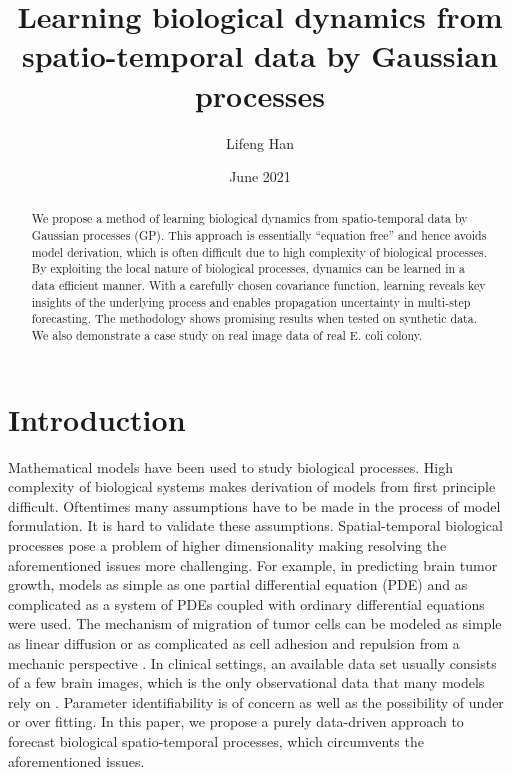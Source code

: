 \documentclass[11pt, reqno]{amsart}
\title[Learning biological dynamics]{Learning biological dynamics from spatio-temporal data by Gaussian processes}
\author{Lifeng Han}
\date{June 2021}
\begin{document}
\onehalfspacing

\begin{abstract}
We propose a method of learning biological dynamics from spatio-temporal data by Gaussian processes (GP). This approach is essentially ``equation free'' and hence avoids model derivation, which is often difficult due to high complexity of biological processes. By exploiting the local nature of biological processes, dynamics can be learned in a data efficient manner. With a carefully chosen covariance function, learning reveals key insights of the underlying process and enables propagation uncertainty in multi-step forecasting. The methodology shows promising results when tested on synthetic data. We also demonstrate a case study on real image data of real E. coli colony.          
\end{abstract}

\maketitle

\section{Introduction}
Mathematical models have been used to study biological processes. High complexity of biological systems makes derivation of models from first principle difficult. Oftentimes many assumptions have to be made in the process of model formulation.  It is hard to validate these assumptions. Spatial-temporal biological processes pose a problem of higher dimensionality making resolving the aforementioned issues more challenging. For example, in predicting brain tumor growth, models as simple as one partial differential equation (PDE) \citep{Jackson2015a} and as complicated as a system of PDEs coupled with ordinary differential equations \citep{Eikenberry2009} were used. The mechanism of migration of tumor cells can be modeled as simple as linear diffusion  or as complicated as cell adhesion and repulsion from a mechanic perspective \citep{khain2012migration,aubert2008model}. In clinical settings, an available data set usually consists of a few brain images, which is the only observational data that many models rely on \citep{lipkova2019personalized,Kostelich2011a,Jackson2015a}. Parameter identifiability is of concern as well as the possibility of under or over fitting. In this paper, we propose a purely data-driven approach to forecast biological spatio-temporal processes, which circumvents the aforementioned issues.              
\end{document}
